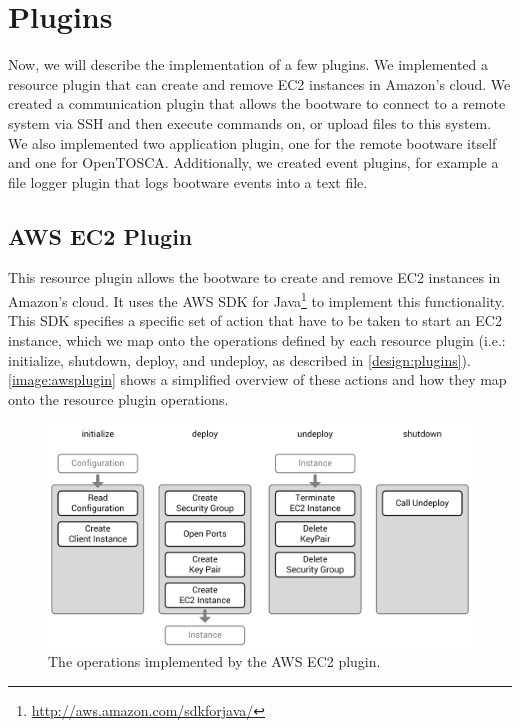 \section{Plugins}
\label{implementation:plugins}

Now, we will describe the implementation of a few plugins.
We implemented a resource plugin that can create and remove EC2 instances in Amazon's cloud.
We created a communication plugin that allows the bootware to connect to a remote system via SSH and then execute commands on, or upload files to this system.
We also implemented two application plugin, one for the remote bootware itself and one for OpenTOSCA.
Additionally, we created event plugins, for example a file logger plugin that logs bootware events into a text file.

\subsection{AWS EC2 Plugin}

This resource plugin allows the bootware to create and remove EC2 instances in Amazon's cloud.
It uses the AWS SDK for Java\footnote{\url{http://aws.amazon.com/sdkforjava/}} to implement this functionality.
This SDK specifies a specific set of action that have to be taken to start an EC2 instance, which we map onto the operations defined by each resource plugin (i.e.: initialize, shutdown, deploy, and undeploy, as described in \autoref{design:plugins}).
\autoref{image:awsplugin} shows a simplified overview of these actions and how they map onto the resource plugin operations.

\begin{figure}[!htbp]
	\centering
	\includegraphics[resolution=600]{implementation/assets/aws_plugin}
	\caption{The operations implemented by the AWS EC2 plugin.}
	\label{image:awsplugin}
\end{figure}

